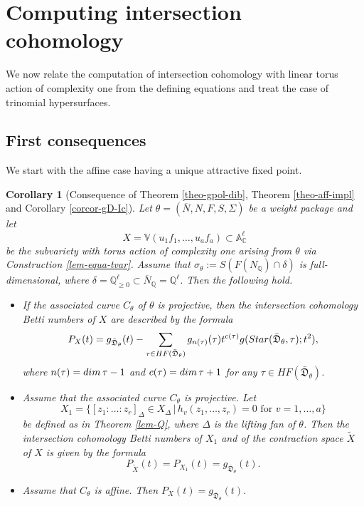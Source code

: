 \documentclass[11pt, reqno]{amsart}
\theoremstyle{plain}
\newtheorem{corollary}[theorem]{Corollary}
\theoremstyle{definition}
\theoremstyle{remark}
\begin{document}
\section{Computing intersection cohomology}\label{sec-six}
We now relate the computation of  intersection cohomology with linear torus action
of complexity one from the defining equations and treat the case of trinomial hypersurfaces.
\subsection{First consequences}\label{sec-first-cons}
We start with the affine case having a unique attractive fixed point.
\begin{corollary}[Consequence of Theorem \ref{theo-gpol-dib}, Theorem \ref{theo-aff-impl} and Corollary \ref{corcor-gD-Ic}]\label{cor-compute-ginv} Let $\theta =  (\overline{N}, N, F, S, \Sigma)$ be a weight package and let 
$$X  =  \mathbb{V}(u_{1} f_{1}, \ldots, u_{a} f_{a})\subset \mathbb{A}^{\ell}_{\mathbb{C}}$$
be the subvariety with torus action of complexity one  arising from $\theta$ via Construction \ref{lem-equa-tvar}. Assume that
$\sigma_{\theta}:= S(F(N_{\mathbb{Q}})\cap \delta)$ is full-dimensional, where $\delta =  \mathbb{Q}_{\geq 0}^{\ell}\subset \overline{N}_{\mathbb{Q}} =  \mathbb{Q}^{\ell}$. Then the following hold.   
\begin{itemize}
\item[$(i)$] If the associated curve $C_{\theta}$ of $\theta$ is projective, then the intersection cohomology Betti numbers
of $X$ are described by the formula
$$P_{X}(t) =  g_{\bar{\mathfrak{D}}_{\theta}}(t) -  \sum_{\tau\in HF(\bar{\mathfrak{D}}_{\theta})} g_{n(\tau)}(\tau) t^{c(\tau)} g({\rm Star}(\bar{\mathfrak{D}}_{\theta}, \tau); t^{2}),$$
where $n(\tau) =  {\rm dim}\, \tau - 1$ and $c(\tau)  =  {\rm dim}\, \tau +1$ for any $\tau \in HF(\bar{\mathfrak{D}}_{\theta})$.
\item[$(ii)$] Assume that the associated curve $C_{\theta}$ is projective. Let
$$X_{1} =  \{[z_{1}: \ldots: z_{r}]_{\Delta}\in X_{\Delta}\,|\, h_{v}(z_{1}, \ldots, z_{r}) =  0  \text{ for } v =  1, \ldots, a\}$$
be defined as in Theorem \ref{lem-Q}, where $\Delta$ is the lifting fan of $\theta$. Then the intersection cohomology Betti numbers of $X_{1}$ and of the
contraction space $\widetilde{X}$ of $X$ is given by the formula
$$P_{\widetilde{X}}(t) =  P_{X_{1}}(t)  =  g_{\bar{\mathfrak{D}}_{\theta}}(t).$$
\item[$(iii)$] Assume that $C_{\theta}$ is affine. Then $P_{X}(t) =  g_{\bar{\mathfrak{D}}_{\theta}}(t).$
\end{itemize}
\end{corollary}
\end{document}
